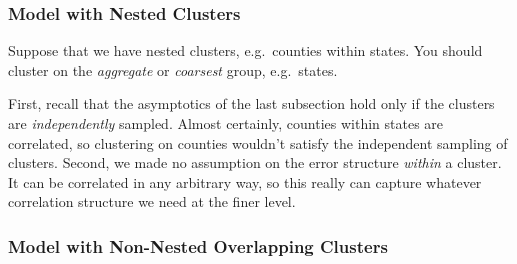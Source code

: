 \documentclass[12pt]{article}
\theoremstyle{plain}
\theoremstyle{definition}
\theoremstyle{remark}
\begin{document}



\clearpage
\subsubsection{Model with Nested Clusters}

Suppose that we have nested clusters, e.g.\ counties within states. You
should cluster on the \emph{aggregate} or \emph{coarsest} group, e.g.\
states.

First, recall that the asymptotics of the last subsection hold only if
the clusters are \emph{independently} sampled. Almost certainly,
counties within states are correlated, so clustering on counties
wouldn't satisfy the independent sampling of clusters. Second, we made
no assumption on the error structure \emph{within} a cluster. It can be
correlated in any arbitrary way, so this really can capture whatever
correlation structure we need at the finer level.


\subsubsection{Model with Non-Nested Overlapping Clusters}
\end{document}
